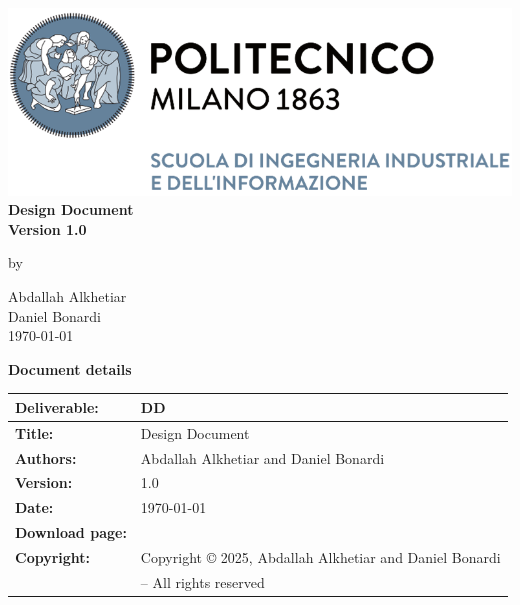 \documentclass[11pt,twoside]{article}
\begin{document}
\begin{center}
\thispagestyle{empty}
\includegraphics[scale=1.25]{Images/PolimiLogo}\\
\vspace{4cm}
\textbf{\Huge{Design Document}}\\
\vspace{1.5cm}
\textbf{\Large{Version 1.0}}\\
\bigskip \par
by \par
\large{Abdallah Alkhetiar}\\
\large{Daniel Bonardi}\\
\bigskip \bigskip
\large{\today}
\end{center}

\newpage

\setcounter{page}{1}
\begin{center}
\textbf{\Huge{Document details}}
\end{center}
\begin{table}[h!]
\begin{tabu} to \textwidth { |X[0.25,r,p] || X[0.75,l,p]| }
\hline

\textbf{Deliverable:} & DD \\
\hline
\textbf{Title:} & Design Document \\
\hline
\textbf{Authors:} & Abdallah Alkhetiar and Daniel Bonardi \\
\hline
\textbf{Version:} & 1.0 \\ 
\hline
\textbf{Date:} & \today \\
\hline
\textbf{Download page:} & \href{https://github.com/Zero3474/AlkhetiarBonardi.git}{\texttt{\color{blue}{github.com/Zero3474/AlkhetiarBonardi.git}}} \\
\hline
\textbf{Copyright:} & Copyright © 2025, Abdallah Alkhetiar and Daniel Bonardi \\
& – All rights reserved \\
\hline
\end{tabu}
\end{table}
\end{document}
